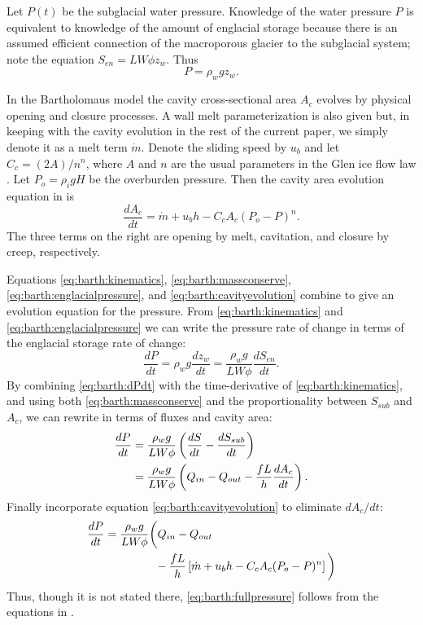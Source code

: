 \documentclass[twocolumn,letterpaper]{igs}
\begin{document}
Let $P(t)$ be the subglacial water pressure.  Knowledge of the water pressure $P$ is equivalent to knowledge of the amount of englacial storage because there is an assumed efficient connection of the macroporous glacier to the subglacial system; note the equation $S_{en}=L W \phi z_w$.  Thus
\begin{equation}
P = \rho_w g z_w.  \label{eq:barth:englacialpressure}
\end{equation}

In the Bartholomaus model the cavity cross-sectional area $A_c$ evolves by physical opening and closure processes.  A wall melt parameterization is also given but, in keeping with the cavity evolution in the rest of the current paper, we simply denote it as a melt term $\dot m$.  Denote the sliding speed by $u_b$ and let $C_c = (2 A)/n^n$, where $A$ and $n$ are the usual parameters in the Glen ice flow law \citep{CuffeyPaterson}.  Let $P_o=\rho_i g H$ be the overburden pressure.  Then the cavity area evolution equation in \cite{Bartholomausetal2011} is
\begin{equation}
\frac{dA_c}{dt} = \dot m + u_b h - C_c A_c (P_o-P)^n.  \label{eq:barth:cavityevolution}
\end{equation}
The three terms on the right are opening by melt, cavitation, and closure by creep, respectively.

Equations \eqref{eq:barth:kinematics}, \eqref{eq:barth:massconserve}, \eqref{eq:barth:englacialpressure}, and \eqref{eq:barth:cavityevolution} combine to give an evolution equation for the pressure.  From \eqref{eq:barth:kinematics} and \eqref{eq:barth:englacialpressure} we can write the pressure rate of change in terms of the englacial storage rate of change:
\begin{equation}
\frac{dP}{dt} = \rho_w g \frac{dz_w}{dt} = \frac{\rho_w g}{L W \phi} \frac{d S_{en}}{dt}. \label{eq:barth:dPdt}
\end{equation}
By combining \eqref{eq:barth:dPdt} with  the time-derivative of \eqref{eq:barth:kinematics}, and using both \eqref{eq:barth:massconserve} and the proportionality between $S_{sub}$ and $A_c$, we can rewrite in terms of fluxes and cavity area:
\begin{align}
\frac{dP}{dt} &= \frac{\rho_w g}{L W \phi} \left(\frac{d S}{dt} - \frac{d S_{sub}}{dt}\right) \\
&= \frac{\rho_w g}{L W \phi} \left(Q_{in} - Q_{out} - \frac{f L }{h} \frac{d A_c}{dt}\right). \notag
\end{align}
Finally incorporate equation \eqref{eq:barth:cavityevolution} to eliminate $dA_c/dt$:
\begin{align}
&\frac{dP}{dt} = \frac{\rho_w g}{L W \phi} \bigg(Q_{in} - Q_{out} \label{eq:barth:fullpressure} \\
&\qquad \qquad \qquad - \frac{f L }{h} \left[\dot m + u_b h - C_c A_c (P_o-P)^n\right]\bigg) \notag
\end{align}
Thus, though it is not stated there, \eqref{eq:barth:fullpressure} follows from the equations in \cite{Bartholomausetal2011}.
\end{document}
